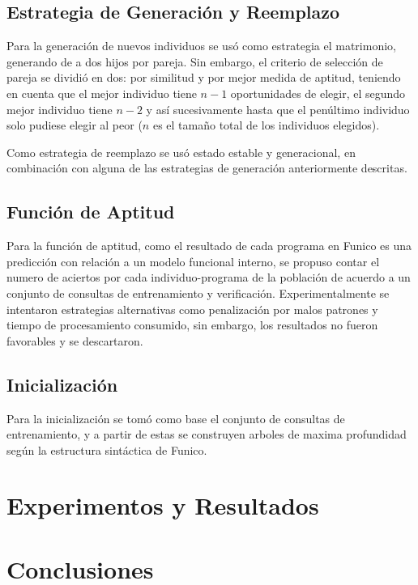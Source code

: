 \documentclass{llncs}
\begin{document}
\subsection{Estrategia de Generación y Reemplazo}
Para la generación de nuevos individuos se usó como estrategia el matrimonio, generando de a dos hijos por pareja. Sin embargo, el criterio de selección de pareja se dividió en dos: por similitud y por mejor medida de aptitud, teniendo en cuenta que el mejor individuo tiene $n-1$ oportunidades de elegir, el segundo mejor individuo tiene $n-2$ y así sucesivamente hasta que el penúltimo individuo solo pudiese elegir al peor ($n$ es el tamaño total de los individuos elegidos).

Como estrategia de reemplazo se usó estado estable y generacional, en combinación con alguna de las estrategias de generación anteriormente descritas.

\subsection{Función de Aptitud}
Para la función de aptitud, como el resultado de cada programa en Funico es una predicción con relación a un modelo funcional interno, se propuso contar el numero de aciertos por cada individuo-programa de la población de acuerdo a un conjunto de consultas de entrenamiento y verificación. Experimentalmente se intentaron estrategias alternativas como penalización por malos patrones y tiempo de procesamiento consumido, sin embargo, los resultados no fueron favorables y se descartaron.

\subsection{Inicialización}
Para la inicialización se tomó como base el conjunto de consultas de entrenamiento, y a partir de estas se construyen arboles de maxima profundidad según la estructura sintáctica de Funico. 

\section{Experimentos y Resultados}


\section{Conclusiones}
\end{document}
